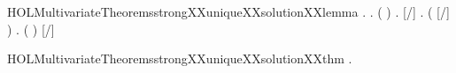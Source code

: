 \begin{SaveVerbatim}{HOLMultivariateTheoremsstrongXXuniqueXXsolutionXXlemma}
\HOLTokenTurnstile{} \HOLSymConst{\HOLTokenForall{}} .
          \HOLSymConst{\HOLTokenConj{}}   \HOLConst{\HOLTokenSubset{}}   \HOLSymConst{\HOLTokenImp{}}
       \HOLSymConst{\HOLTokenForall{}}.
           (  \HOLSymConst{=}  ) \HOLSymConst{\HOLTokenImp{}}
           \HOLSymConst{\HOLTokenForall{}} .
               [/]  \HOLTokenTransBegin{}\HOLTokenTransEnd {} \HOLSymConst{\HOLTokenImp{}}
               \HOLSymConst{\HOLTokenExists{}}.
                      \HOLSymConst{\HOLTokenConj{}}   \HOLConst{\HOLTokenSubset{}}   \HOLSymConst{\HOLTokenConj{}}
                   ( \HOLSymConst{=} [/] ) \HOLSymConst{\HOLTokenConj{}}
                   \HOLSymConst{\HOLTokenForall{}}.
                       (  \HOLSymConst{=}  ) \HOLSymConst{\HOLTokenImp{}}
                       [/]  \HOLTokenTransBegin{} 
\end{SaveVerbatim}
\newcommand{\HOLMultivariateTheoremsstrongXXuniqueXXsolutionXXlemma}{\UseVerbatim{HOLMultivariateTheoremsstrongXXuniqueXXsolutionXXlemma}}
\begin{SaveVerbatim}{HOLMultivariateTheoremsstrongXXuniqueXXsolutionXXthm}
\HOLTokenTurnstile{} \HOLSymConst{\HOLTokenForall{}}   .
          \HOLSymConst{\HOLTokenConj{}}    \HOLSymConst{\HOLTokenConj{}}
        \HOLConst{\HOLTokenIn{}}     \HOLSymConst{\HOLTokenConj{}}
        \HOLConst{\HOLTokenIn{}}     \HOLSymConst{\HOLTokenImp{}}
         
\end{SaveVerbatim}
